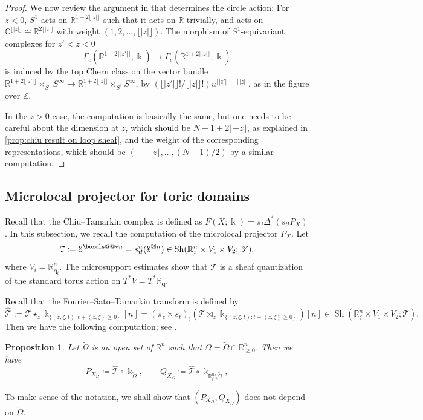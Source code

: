\documentclass[11pt]{amsart}
\makeatletter
\numberwithin{equation}{section}
\theoremstyle{plain}
\newtheorem{Prop}[prop]{Proposition}
\theoremstyle{definition}
\theoremstyle{remark}
\newcommand{\bC} { {\mathbb{C}}}
\newcommand{\bZ} { {\mathbb{Z}}}
\newcommand{\bR} { {\mathbb{R}}}
\newcommand{\sT} { {\mathscr{T}}}
\newcommand{\bq} { {\textbf{q}}}
\newcommand{\Sh} { {\operatorname{Sh}}}
\newcommand\boxstar{\mathrel{\boxcls@{\star}}}
\newcommand{\boxcls@}[1]{%
  \vphantom{\Box}%
  \mathpalette\boxcls@@{#1}%
}
\newcommand{\boxcls@@}[2]{%
  \ooalign{$\m@th#1\Box$\cr
  \hidewidth\boxcls@fix{#1}\hbox{$\m@th#1#2\mkern 2.4mu$}\cr}}
\newcommand\boxcls@fix[1]{
  \ifx#1\displaystyle
    \raise.225ex
  \else
    \ifx#1\textstyle
      \raise.225ex
    \else
      \ifx#1\scriptstyle
        \raise.180ex
      \else
        \raise.150ex
      \fi
    \fi
  \fi
}
\makeatother
\begin{document}
\begin{proof}
We now review the argument in \cite[after Remark 4.13]{zhangthesis} that determines the circle action: For $z<0$, $S^1$ acts on $\bR^{1+2\lfloor |z| \rfloor}$ such that it acts on $\bR$ trivially, and acts on $\bC^{\lfloor |z| \rfloor} \cong \bR^{2\lfloor |z|\rfloor}$ with weight $(1, 2, \dots, \lfloor |z| \rfloor)$. The morphism of $S^1$-equivariant complexes for $z'<z<0$
\[\Gamma_c(\bR^{1+2\lfloor |z'|\rfloor}; \Bbbk ) \to \Gamma_c(\bR^{1+2\lfloor |z|\rfloor}; \Bbbk )\]
is induced by the top Chern class on the vector bundle $\bR^{1+2\lfloor |z'|\rfloor} \times_{S^1} S^\infty \to \bR^{1+2\lfloor |z|\rfloor} \times_{S^1} S^\infty$, by $(\lfloor |z'|\rfloor !/\lfloor |z|\rfloor!)u^{\lfloor |z'|\rfloor -\lfloor |z|\rfloor}$, as in the figure over $\bZ$.

In the $z>0$ case, the computation is basically the same, but one needs to be careful about the dimension at $z$, which should be $N+1+2\lfloor -z\rfloor$, as explained in \autoref{prop:chiu result on loop sheaf}, and the weight of the corresponding representations, which should be $(-\lfloor -z\rfloor,   \dots, (N-1)/2)$ by a similar computation.
\end{proof}




\subsection{Microlocal projector for toric domains}
Recall that the Chiu--Tamarkin complex is defined as $F(X; \Bbbk ) = \pi_!\Delta^*(s_{t!}P_X)$. In this subsection, we recall the computation of the microlocal projector $P_X$.
Let
\begin{equation}\label{sheafquantization of Hamiltonian torus action}
 \mathcal{T}\coloneqq \mathcal{S}^{\boxstar n}=s_{t!}^n(\mathcal{S}^{\boxtimes n}) \in \Sh(\bR_{{z}}^n\times V_{1}\times V_{2};\sT ),   
\end{equation}
where $ V_{i}=\bR^n_{\bq_i}$.
The microsupport estimates show that $\mathcal{T}$ is a sheaf quantization of the standard torus action on $T^*V = T^*\bR_{\bq}$. 

Recall that the Fourier--Sato--Tamarkin transform is defined by \cite[Definition 1.13]{Capacities2021}
\[\widehat{\mathcal{T}} := \mathcal{T} \star_{z} \Bbbk _{\{(z,\zeta,t):t+\left<z,\zeta\right>\geq 0\}} [n]= (\pi_z \times s_{t})_!(\mathcal{T} \boxtimes_z \Bbbk _{\{(z,\zeta,t):t+\left<z,\zeta\right>\geq 0\}})[n] \in \Sh(\bR^n_\zeta \times V_1 \times V_2; \sT).\]
Then we have the following computation; see \cite[Propositions 2.8, 3.3 \& Equation (3.7)]{Capacities2021}. 
\begin{Prop}Let $\widetilde{\Omega}$ is an open set of $\bR^n$ such that $\Omega=\widetilde{\Omega}\cap \bR^n_{\geq 0}$. Then we have
\begin{equation}
    P_{X_{\Omega}}\coloneqq \widehat{\mathcal{T}}\circ {\Bbbk }_{\widetilde{\Omega}} ,\qquad Q_{X_{\Omega}}\coloneqq \widehat{\mathcal{T}}\circ {\Bbbk }_{\bR^n_{{\zeta}}\setminus\widetilde{\Omega}},
\end{equation}
\end{Prop}
To make sense of the notation, we shall show that $(P_{X_{\Omega}}, Q_{X_{\Omega}}) $  does not depend on $\widetilde{\Omega}$.
\end{document}
